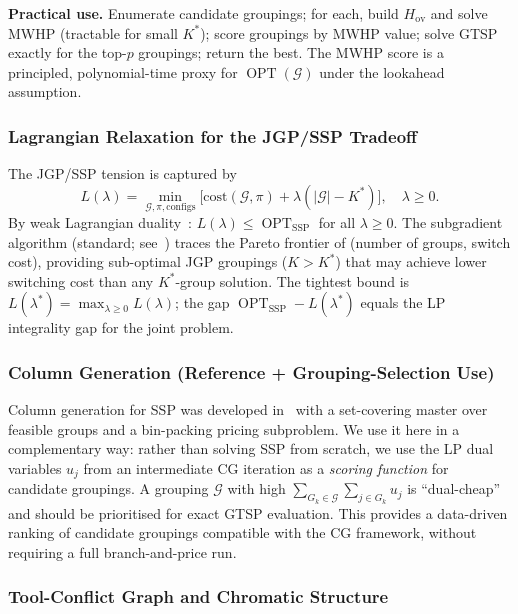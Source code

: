 \documentclass[11pt,a4paper]{article}
\theoremstyle{plain}
\theoremstyle{definition}
\DeclareMathOperator{\OPT}{OPT}
\newcommand{\calG}{\mathcal{G}}
\newcommand{\Kstar}{K^{*}}
\begin{document}
\noindent\textbf{Practical use.}
Enumerate candidate groupings; for each, build $H_{\mathrm{ov}}$ and solve MWHP
(tractable for small $\Kstar$); score groupings by MWHP value; solve GTSP exactly
for the top-$p$ groupings; return the best.
The MWHP score is a principled, polynomial-time proxy for $\OPT(\calG)$
under the lookahead assumption.

\subsubsection{Lagrangian Relaxation for the JGP/SSP Tradeoff}
\label{sec:lagrangian}

The JGP/SSP tension is captured by
\[
  L(\lambda)=\min_{\calG,\pi,\text{configs}}
  \bigl[\mathrm{cost}(\calG,\pi)+\lambda(|\calG|-\Kstar)\bigr],\quad\lambda\ge 0.
\]
By weak Lagrangian duality~\cite[Ch.~10]{Wolsey1998}:
$L(\lambda)\le\OPT_{\mathrm{SSP}}$ for all $\lambda\ge 0$.
The subgradient algorithm (standard; see~\cite{Wolsey1998}) traces the Pareto frontier
of (number of groups, switch cost), providing sub-optimal JGP groupings ($K>\Kstar$)
that may achieve lower switching cost than any $\Kstar$-group solution.
The tightest bound is $L(\lambda^*)=\max_{\lambda\ge 0}L(\lambda)$; the gap
$\OPT_{\mathrm{SSP}}-L(\lambda^*)$ equals the LP integrality gap for the joint problem.

\subsubsection{Column Generation (Reference + Grouping-Selection Use)}
\label{sec:CG}

Column generation for SSP was developed in~\cite{daSilva2021} with a set-covering
master over feasible groups and a bin-packing pricing subproblem.
We use it here in a complementary way: rather than solving SSP from scratch, we use
the LP dual variables $u_j$ from an intermediate CG iteration as a \emph{scoring
function} for candidate groupings.
A grouping $\calG$ with high $\sum_{G_k\in\calG}\sum_{j\in G_k}u_j$
is ``dual-cheap'' and should be prioritised for exact GTSP evaluation.
This provides a data-driven ranking of candidate groupings compatible with the
CG framework, without requiring a full branch-and-price run.

\subsubsection{Tool-Conflict Graph and Chromatic Structure}
\label{sec:conflict}
\end{document}
